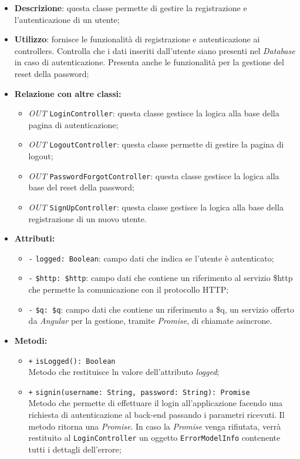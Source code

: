 \begin{itemize}
	\item \textbf{Descrizione}: questa classe permette di gestire la registrazione e l'autenticazione di un utente;
	\item \textbf{Utilizzo}: fornisce le funzionalità di registrazione e autenticazione ai controllers. Controlla che i dati inseriti dall'utente siano presenti nel \textit{Database} in caso di autenticazione. Presenta anche le funzionalità per la gestione del reset della password;
	\item \textbf{Relazione con altre classi:}
	\begin{itemize}
		\item \textit{OUT} \texttt{LoginController}: questa classe gestisce la logica alla base della pagina di autenticazione;
		\item \textit{OUT} \texttt{LogoutController}: questa classe permette di gestire la pagina di logout;
		\item \textit{OUT} \texttt{PasswordForgotController}: questa classe gestisce la logica alla base del reset della password;
		\item \textit{OUT} \texttt{SignUpController}: questa classe gestisce la logica alla base della registrazione di un nuovo utente.
	\end{itemize}
	\item \textbf{Attributi:}
	\begin{itemize}
		\item \texttt{-} \texttt{logged: Boolean}: campo dati che indica se l'utente è autenticato;
		\item \texttt{-} \texttt{\$http: \$http}: campo dati che contiene un riferimento al servizio \$http che permette la comunicazione con il protocollo HTTP;
		\item \texttt{-} \texttt{\$q: \$q}: campo dati che contiene un riferimento a \$q, un servizio offerto da \textit{Angular} per la gestione, tramite \textit{Promise}, di chiamate asincrone.
	\end{itemize}
	\item \textbf{Metodi:}
	\begin{itemize}
		\item \texttt{+} \texttt{isLogged(): Boolean} \\ Metodo che restituisce ln valore dell'attributo \textit{logged};
		\item \texttt{+} \texttt{signin(username: String, password: String): Promise}\\ Metodo che permette di effettuare il login all'applicazione facendo una richiesta di autenticazione al back-end passando i parametri ricevuti. Il metodo ritorna una \textit{Promise}. In caso la \textit{Promise} venga rifiutata, verrà restituito al \texttt{LoginController} un oggetto \texttt{ErrorModelInfo} contenente tutti i dettagli dell'errore; \\

\end{itemize}
\end{itemize}
